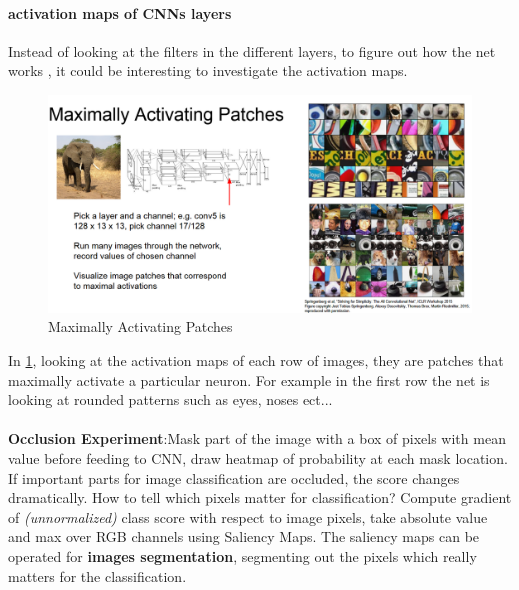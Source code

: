 \documentclass[11pt]{article}
\begin{document}
\paragraph{activation maps of CNNs layers}
Instead of looking at the filters in the different layers, to figure out how the net works , it could be interesting to investigate the activation maps.
\clearpage
\begin{figure}[h]
\centering
\captionsetup{justification=centering}
\includegraphics[width=0.7\linewidth]{L1112.pdf}
\caption{ Maximally Activating Patches }
\label{fig:L1112}
\end{figure}
In \ref{fig:L1112}, looking at the activation maps of each row of images, they are patches that maximally activate a particular neuron. For example in the first row the net is looking at rounded patterns such as eyes, noses ect...\\\\
\textbf{Occlusion Experiment}:Mask part  of the image with a box of pixels with mean value before feeding to CNN, draw heatmap of probability at each mask location. If important parts for image classification are occluded, the score changes dramatically. How to tell which pixels matter for classification? Compute gradient of \textit{(unnormalized)} class score with respect to image pixels, take absolute value and max over RGB channels using Saliency Maps. The saliency maps can be operated for \textbf{images segmentation}, segmenting out the pixels which really matters for the classification.
\end{document}
